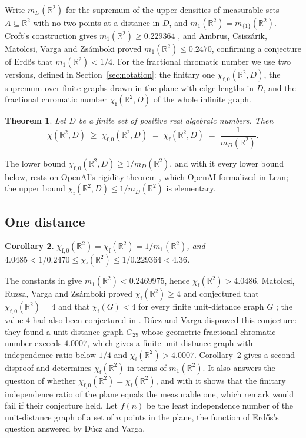 \documentclass[11pt,a4paper]{amsart}
\newtheorem{theorem}{Theorem}
\newtheorem{corollary}[theorem]{Corollary}
\theoremstyle{definition}
\theoremstyle{remark}
\newcommand{\R}{\mathbb{R}}
\newcommand{\chif}{\chi_{\mathrm f}}
\begin{document}
Write $m_D(\R^2)$ for the supremum of the upper densities of measurable sets $A\subseteq\R^2$ with no two points at a
distance in $D$, and $m_1(\R^2)=m_{\{1\}}(\R^2)$. Croft's construction gives $m_1(\R^2)\ge 0.229364$ \cite{Croft},
and Ambrus, Csiszárik, Matolcsi, Varga and Zsámboki \cite{ACMVZ} proved $m_1(\R^2)\le 0.2470$, confirming a
conjecture of Erd\H{o}s that $m_1(\R^2)<1/4$. For the fractional chromatic number we use two versions, defined in
Section~\ref{sec:notation}: the finitary one $\chi_{\mathrm f,0}(\R^2,D)$, the supremum over finite graphs drawn in
the plane with edge lengths in $D$, and the fractional chromatic number $\chif(\R^2,D)$ of the whole infinite graph.

\begin{theorem}\label{thm:main}
Let $D$ be a finite set of positive real algebraic numbers. Then
\[
\chi(\R^2,D)\;\ge\;\chi_{\mathrm f,0}(\R^2,D)\;=\;\chif(\R^2,D)\;=\;\frac1{m_D(\R^2)}.
\]
\end{theorem}

The lower bound $\chi_{\mathrm f,0}(\R^2,D)\ge1/m_D(\R^2)$, and with it every lower bound below, rests on OpenAI's
rigidity theorem \cite[Thm.~2.3]{OpenAI}, which OpenAI formalized in Lean; the upper bound
$\chif(\R^2,D)\le1/m_D(\R^2)$ is elementary.

\subsection*{One distance}

\begin{corollary}\label{cor:frac}
$\chi_{\mathrm f,0}(\R^2)=\chif(\R^2)=1/m_1(\R^2)$, and $4.0485<1/0.2470\le\chif(\R^2)\le 1/0.229364<4.36$.
\end{corollary}

The constants in \cite[§8]{ACMVZ} give $m_1(\R^2)<0.2469975$, hence $\chif(\R^2)>4.0486$. Matolcsi, Ruzsa, Varga and
Zsámboki \cite{MRVZ} proved $\chif(\R^2)\ge 4$ and conjectured that $\chi_{\mathrm f,0}(\R^2)=4$ and that
$\chif(G)<4$ for every finite unit-distance graph $G$ \cite[Conj.~1]{MRVZ}; the value $4$ had also been conjectured
in \cite[Remark after Cor.~2]{ACMVZ}. Dúcz and Varga \cite{DV} disproved this conjecture: they found a unit-distance
graph $G_{29}$ whose geometric fractional chromatic number exceeds $4.0007$, which gives a finite unit-distance graph
with independence ratio below $1/4$ and $\chif(\R^2)>4.0007$. Corollary~\ref{cor:frac} gives a second disproof and
determines $\chif(\R^2)$ in terms of $m_1(\R^2)$. It also answers the question of \cite{MRVZ} whether
$\chi_{\mathrm f,0}(\R^2)=\chif(\R^2)$, and with \cite[Thm.~2]{MRVZ} it shows that the finitary independence ratio
of the plane equals the measurable one, which \cite{MRVZ} remark would fail if their conjecture held. Let $f(n)$ be
the least independence number of the unit-distance graph of a set of $n$ points in the plane, the function of
Erd\H{o}s's question \cite{Erdos87} answered by Dúcz and Varga.
\end{document}
